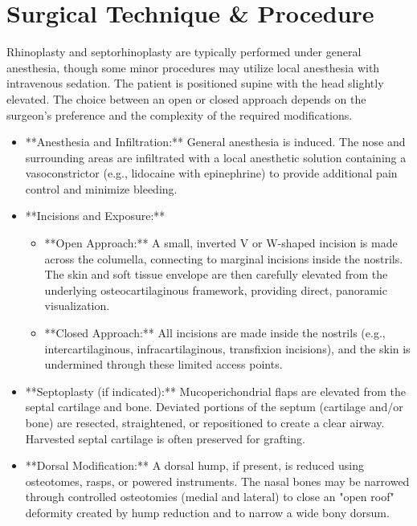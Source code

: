 \section*{Surgical Technique \& Procedure}
Rhinoplasty and septorhinoplasty are typically performed under general anesthesia, though some minor procedures may utilize local anesthesia with intravenous sedation. The patient is positioned supine with the head slightly elevated. The choice between an open or closed approach depends on the surgeon's preference and the complexity of the required modifications.

\begin{itemize}
  \item **Anesthesia and Infiltration:** General anesthesia is induced. The nose and surrounding areas are infiltrated with a local anesthetic solution containing a vasoconstrictor (e.g., lidocaine with epinephrine) to provide additional pain control and minimize bleeding.
  
  \item **Incisions and Exposure:**
    \begin{itemize}
      \item **Open Approach:** A small, inverted V or W-shaped incision is made across the columella, connecting to marginal incisions inside the nostrils. The skin and soft tissue envelope are then carefully elevated from the underlying osteocartilaginous framework, providing direct, panoramic visualization.
      \item **Closed Approach:** All incisions are made inside the nostrils (e.g., intercartilaginous, infracartilaginous, transfixion incisions), and the skin is undermined through these limited access points.
    \end{itemize}
  
  \item **Septoplasty (if indicated):** Mucoperichondrial flaps are elevated from the septal cartilage and bone. Deviated portions of the septum (cartilage and/or bone) are resected, straightened, or repositioned to create a clear airway. Harvested septal cartilage is often preserved for grafting.
  
  \item **Dorsal Modification:** A dorsal hump, if present, is reduced using osteotomes, rasps, or powered instruments. The nasal bones may be narrowed through controlled osteotomies (medial and lateral) to close an "open roof" deformity created by hump reduction and to narrow a wide bony dorsum.
  

\end{itemize}
